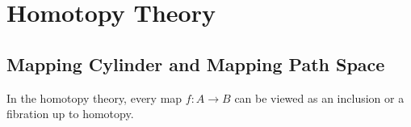 

\section{Homotopy Theory}
    \subsection{Mapping Cylinder and Mapping Path Space}
    In the homotopy theory, every map $f: A \to B$ 
    can be viewed as an inclusion or a fibration up to homotopy. 

